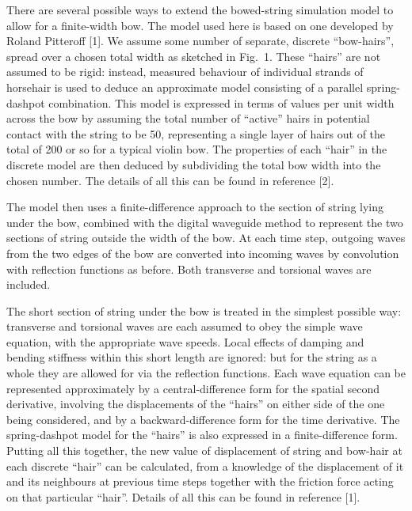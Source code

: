   There are several possible ways to extend the bowed-string simulation model 
  to allow for a finite-width bow. The model used here is based on one 
  developed by Roland Pitteroff [1]. We assume some number of separate, 
  discrete “bow-hairs”, spread over a chosen total width as sketched in Fig.\ 
  1. These “hairs” are not assumed to be rigid: instead, measured behaviour of 
  individual strands of horsehair is used to deduce an approximate model 
  consisting of a parallel spring-dashpot combination. This model is expressed 
  in terms of values per unit width across the bow by assuming the total number 
  of “active” hairs in potential contact with the string to be 50, representing 
  a single layer of hairs out of the total of 200 or so for a typical violin 
  bow. The properties of each “hair” in the discrete model are then deduced by 
  subdividing the total bow width into the chosen number. The details of all 
  this can be found in reference [2]. 

  The model then uses a finite-difference approach to the section of string 
  lying under the bow, combined with the digital waveguide method to represent 
  the two sections of string outside the width of the bow. At each time step, 
  outgoing waves from the two edges of the bow are converted into incoming 
  waves by convolution with reflection functions as before. Both transverse and 
  torsional waves are included. 

  The short section of string under the bow is treated in the simplest possible 
  way: transverse and torsional waves are each assumed to obey the simple wave 
  equation, with the appropriate wave speeds. Local effects of damping and 
  bending stiffness within this short length are ignored: but for the string as 
  a whole they are allowed for via the reflection functions. Each wave equation 
  can be represented approximately by a central-difference form for the spatial 
  second derivative, involving the displacements of the “hairs” on either side 
  of the one being considered, and by a backward-difference form for the time 
  derivative. The spring-dashpot model for the “hairs” is also expressed in a 
  finite-difference form. Putting all this together, the new value of 
  displacement of string and bow-hair at each discrete “hair” can be 
  calculated, from a knowledge of the displacement of it and its neighbours at 
  previous time steps together with the friction force acting on that 
  particular “hair”. Details of all this can be found in reference [1]. 

